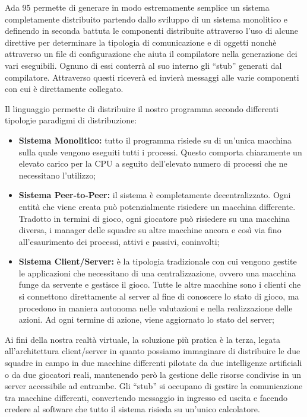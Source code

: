 \documentclass[aps,letterpaper,10pt]{article}
\begin{document}
Ada 95 permette di generare in modo estremamente semplice un sistema completamente distribuito partendo dallo sviluppo di un sistema monolitico e definendo in seconda battuta le componenti distribuite attraverso l'uso di alcune direttive per determinare la tipologia di comunicazione e di oggetti nonch\`e attraverso un file di configurazione che aiuta il compilatore nella generazione dei vari eseguibili. Ognuno di essi conterr\`a al suo interno gli ``stub'' generati dal compilatore. Attraverso questi ricever\`a ed invier\`a messaggi alle varie componenti con cui \`e direttamente collegato. \vspace{3mm}

Il linguaggio permette di distribuire il nostro programma secondo differenti tipologie paradigmi di distribuzione:

\begin{itemize}
	\item \textbf{Sistema Monolitico:} tutto il programma risiede su di un'unica macchina sulla quale vengono eseguiti tutti i processi. Questo comporta chiaramente un elevato carico per la CPU a seguito dell'elevato numero di processi che ne necessitano l'utilizzo;
	\item \textbf{Sistema Peer-to-Peer:} il sistema \`e completamente decentralizzato. Ogni entit\`a che viene creata pu\`o potenzialmente risiedere un macchina differente. Tradotto in termini di gioco, ogni giocatore pu\`o risiedere su una macchina diversa, i manager delle squadre su altre macchine ancora e cos\`i via fino all'esaurimento dei processi, attivi e passivi, coninvolti;
	\item \textbf{Sistema Client/Server:} \`e la tipologia tradizionale con cui vengono gestite le applicazioni che necessitano di una centralizzazione, ovvero una macchina funge da servente e gestisce il gioco. Tutte le altre macchine sono i clienti che si connettono direttamente al server al fine di conoscere lo stato di gioco, ma procedono in maniera autonoma nelle valutazioni e nella realizzazione delle azioni. Ad ogni termine di azione, viene aggiornato lo stato del server;
\end{itemize}

Ai fini della nostra realt\`a virtuale, la soluzione pi\`u pratica \`e la terza, legata all'architettura client/server in quanto possiamo immaginare di distribuire le due squadre in campo in due macchine differenti pilotate da due intelligenze artificiali o da due giocatori reali, mantenendo per\`o la gestione delle risorse condivise in un server accessibile ad entrambe. Gli ``stub'' si occupano di gestire la comunicazione tra macchine differenti, convertendo messaggio in ingresso ed uscita e facendo credere al software che tutto il sistema risieda su un'unico calcolatore. \vspace{3mm}
\end{document}
